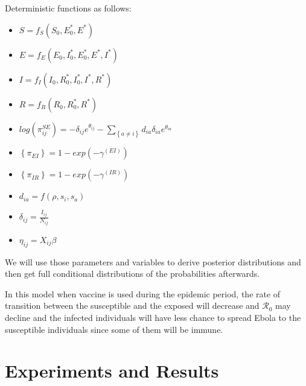 \documentclass[12pt]{article}
\newcommand \mbreak {\\ \vspace{0.1in}}
\begin{document}
Deterministic functions as follows: 
\\
\begin{itemize}
\item $S = f_S(S_0, E^*_0, E^*)$ \\

\item $E = f_E(E_0, I^*_0, E^*_0, E^*, I^*)$ \\

\item $I = f_I(I_0, R^*_0, I^*_0, I^*, R^*)$ \\

\item $R = f_R(R_0, R^*_0, R^*)$ \\

\item $\displaystyle log(\pi^{SE}_{ij}) = -\delta_{ij}e^{\theta_{ij}} - \sum_{\left\{ a \ne i \right\}}d_{ia}\delta_{ia}e^{\theta_{ia}}$\\

\item $\left\{\pi_{EI}  \right\} = 1-exp({-\gamma^{(EI)}})$\\

\item $\left\{\pi_{IR}  \right\} = 1-exp({-\gamma^{(IR)}})$\\

\item $d_{ia} = f(\rho, s_i, s_a)$\\

\item $\delta_{ij} = \frac{I_{ij}}{N_{ij}}$ \\

\item $\eta_{ij} = X_{ij}\beta$\mbreak

\end{itemize}

We will use those parameters and variables to derive posterior distributions and then get full conditional distributions of the probabilities afterwards. 

In this model when vaccine is used during the epidemic period, the rate of transition between the susceptible and the exposed will decrease and $\mathcal{R}_0$ may decline and the infected individuals will have less chance to spread Ebola to the susceptible individuals since some of them will be immune. 

\section{Experiments and Results}
\end{document}
